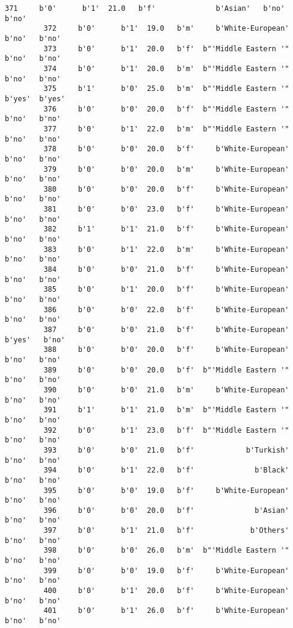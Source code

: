 \documentclass[11pt]{article}
\begin{document}
\begin{Verbatim}[commandchars=\\\{\}]
         371     b'0'      b'1'  21.0   b'f'              b'Asian'   b'no'   b'no'   
         372     b'0'      b'1'  19.0   b'm'     b'White-European'   b'no'   b'no'   
         373     b'0'      b'1'  20.0   b'f'  b"'Middle Eastern '"   b'no'   b'no'   
         374     b'0'      b'1'  20.0   b'm'  b"'Middle Eastern '"   b'no'   b'no'   
         375     b'1'      b'0'  25.0   b'm'  b"'Middle Eastern '"  b'yes'  b'yes'   
         376     b'0'      b'0'  20.0   b'f'  b"'Middle Eastern '"   b'no'   b'no'   
         377     b'0'      b'1'  22.0   b'm'  b"'Middle Eastern '"   b'no'   b'no'   
         378     b'0'      b'0'  20.0   b'f'     b'White-European'   b'no'   b'no'   
         379     b'0'      b'0'  20.0   b'm'     b'White-European'   b'no'   b'no'   
         380     b'0'      b'0'  20.0   b'f'     b'White-European'   b'no'   b'no'   
         381     b'0'      b'0'  23.0   b'f'     b'White-European'   b'no'   b'no'   
         382     b'1'      b'1'  21.0   b'f'     b'White-European'   b'no'   b'no'   
         383     b'0'      b'1'  22.0   b'm'     b'White-European'   b'no'   b'no'   
         384     b'0'      b'0'  21.0   b'f'     b'White-European'   b'no'   b'no'   
         385     b'0'      b'1'  20.0   b'f'     b'White-European'   b'no'   b'no'   
         386     b'0'      b'0'  22.0   b'f'     b'White-European'   b'no'   b'no'   
         387     b'0'      b'0'  21.0   b'f'     b'White-European'  b'yes'   b'no'   
         388     b'0'      b'0'  20.0   b'f'     b'White-European'   b'no'   b'no'   
         389     b'0'      b'0'  20.0   b'f'  b"'Middle Eastern '"   b'no'   b'no'   
         390     b'0'      b'0'  21.0   b'm'     b'White-European'   b'no'   b'no'   
         391     b'1'      b'1'  21.0   b'm'  b"'Middle Eastern '"   b'no'   b'no'   
         392     b'0'      b'1'  23.0   b'f'  b"'Middle Eastern '"   b'no'   b'no'   
         393     b'0'      b'0'  21.0   b'f'            b'Turkish'   b'no'   b'no'   
         394     b'0'      b'1'  22.0   b'f'              b'Black'   b'no'   b'no'   
         395     b'0'      b'0'  19.0   b'f'     b'White-European'   b'no'   b'no'   
         396     b'0'      b'0'  20.0   b'f'              b'Asian'   b'no'   b'no'   
         397     b'0'      b'1'  21.0   b'f'             b'Others'   b'no'   b'no'   
         398     b'0'      b'0'  26.0   b'm'  b"'Middle Eastern '"   b'no'   b'no'   
         399     b'0'      b'0'  19.0   b'f'     b'White-European'   b'no'   b'no'   
         400     b'0'      b'1'  20.0   b'f'     b'White-European'   b'no'   b'no'   
         401     b'0'      b'1'  26.0   b'f'     b'White-European'   b'no'   b'no'   

\end{Verbatim}
\end{document}
